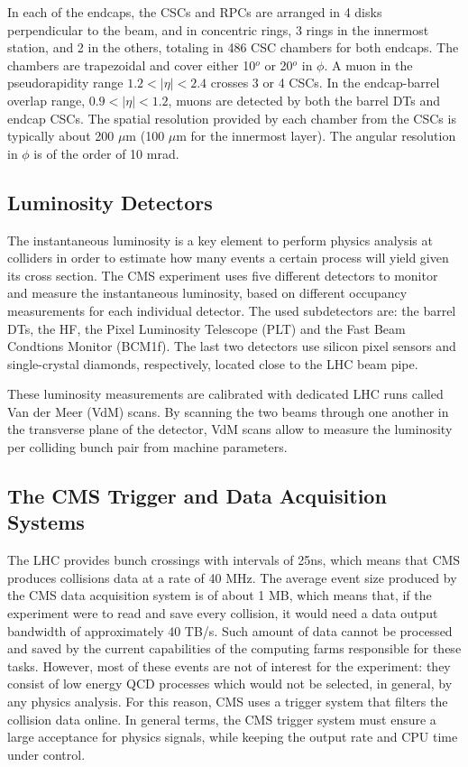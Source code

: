 In each of the endcaps, the CSCs and RPCs are arranged in 4 disks perpendicular to the beam, and in concentric rings, 3 rings in the innermost station, and 2 in the others, totaling in 486 CSC chambers for both endcaps. 
The chambers are trapezoidal and cover either 10$^{o}$ or 20$^{o}$ in $\phi$. 
A muon in the pseudorapidity range $1.2 < |\eta | < 2.4$ crosses 3 or 4 CSCs. 
In the endcap-barrel overlap range, $0.9 < |\eta | < 1.2$, muons are detected by both the barrel DTs and endcap CSCs. 
The spatial resolution provided by each chamber from the CSCs is typically about 200 $\mu$m (100 $\mu$m for the innermost layer). The angular resolution in $\phi$ is of the order of 10 mrad.

\subsection{Luminosity Detectors}

The instantaneous luminosity is a key element to perform physics analysis at colliders in order to estimate how many events a certain process will yield given its cross section. 
The CMS experiment uses five different detectors to monitor and measure the instantaneous luminosity, based on different occupancy measurements for each individual detector. 
The used subdetectors are: the barrel DTs, the HF, the Pixel Luminosity Telescope (PLT) and the Fast Beam Condtions Monitor (BCM1f). 
The last two detectors use silicon pixel sensors and single-crystal diamonds, respectively, located close to the LHC beam pipe. 

These luminosity measurements are calibrated with dedicated LHC runs called Van der Meer (VdM) scans. 
By scanning the two beams through one another in the transverse plane of the detector, VdM scans allow to measure the luminosity per colliding bunch pair from machine parameters. 

\subsection{The CMS Trigger and Data Acquisition Systems}

The LHC provides bunch crossings with intervals of 25ns, which means that CMS produces collisions data at a rate of 40 MHz. 
The average event size produced by the CMS data acquisition system is of about 1 MB, which means that, if the experiment were to read and save every collision, it would need a data output bandwidth of approximately 40 TB/s. 
Such amount of data cannot be processed and saved by the current capabilities of the computing farms responsible for these tasks. 
However, most of these events are not of interest for the experiment: they consist of low energy QCD processes which would not be selected, in general, by any physics analysis. 
For this reason, CMS uses a trigger system that filters the collision data online. 
In general terms, the CMS trigger system must ensure a large acceptance for physics signals, while keeping the output rate and CPU time under control.

